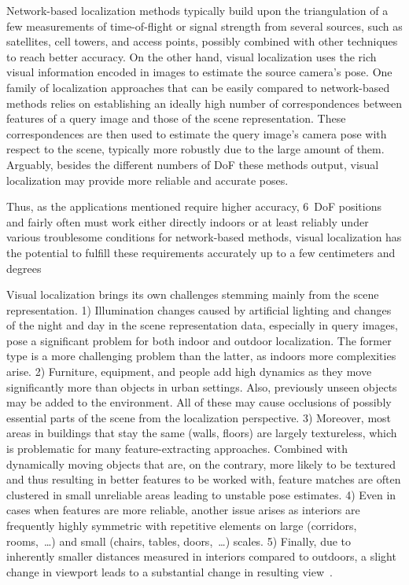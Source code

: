 Network-based localization methods typically build upon the triangulation of a few measurements
of time-of-flight or signal strength from several sources, such as satellites, cell towers,
and access points, possibly combined with other techniques to reach better accuracy.
On the other hand, visual localization uses the rich visual information encoded in images to 
estimate the source camera's pose. One family of localization approaches that can be easily compared to
network-based methods relies on establishing an ideally high number of correspondences between
features of a query image and those of the scene representation. These correspondences are then
used to estimate the query image's camera pose with respect to the scene, typically more robustly
due to the large amount of them. Arguably, besides the different numbers of DoF these methods output,
visual localization may provide more reliable and accurate poses.

Thus, as the applications mentioned require higher accuracy, 6~DoF positions and fairly often
must work either directly indoors or at least reliably under various troublesome conditions for
network-based methods, visual localization has the potential to fulfill these
requirements accurately up to a few centimeters and
degrees

Visual localization brings its own challenges stemming mainly from the scene representation.
1) Illumination changes caused by artificial lighting and changes of the night and day
in the scene representation data, especially in query images, pose a significant problem
for both indoor and outdoor localization. The former type is a more challenging problem than the latter,
as indoors more complexities arise. 2) Furniture, equipment, and people add high dynamics
as they move significantly more than objects in urban settings. Also, previously unseen
objects may be added to the environment. All of these may cause
occlusions of possibly essential parts of the scene from the localization perspective. 3) Moreover, most
areas in buildings that stay the same (walls, floors) are largely textureless, which is problematic for many
feature-extracting approaches. Combined with dynamically moving objects that are, on the contrary,
more likely to be textured and thus resulting in better features to be worked with, feature
matches are often clustered in small unreliable areas leading to unstable pose estimates. 4) Even
in cases when features are more reliable, another issue arises as interiors are frequently
highly symmetric with repetitive elements on large (corridors, rooms,~\ldots) and small
(chairs, tables, doors,~\ldots) scales. 5) Finally, due to inherently smaller distances measured
in interiors compared to outdoors, a slight change in viewport leads to a substantial change in resulting
view~\citep{InLoc}.

